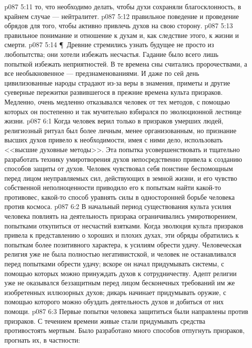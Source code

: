 \vs p087 5:11 \bibnobreakspace {} то, что необходимо делать, чтобы духи сохраняли благосклонность, в крайнем случае --- нейтралитет.
\vs p087 5:12 \bibnobreakspace {} правильное поведение и проведение обрядов для того, чтобы активно привлечь духов на свою сторону.
\vs p087 5:13 \bibnobreakspace {} правильное понимание и отношение к духам и, как следствие этого, к жизни и смерти.
\vs p087 5:14 \P\ Древние стремились узнать будущее не просто из любопытства; они хотели избежать несчастья. Гадание было всего лишь попыткой избежать неприятностей. В те времена сны считались пророчествами, а все необыкновенное --- предзнаменованиями. И даже по сей день цивилизованные народы страдают из\hyp{}за веры в знамения, приметы и другие суеверные пережитки развившегося в прежние времена культа призраков. Медленно, очень медленно отказывался человек от тех методов, с помощью которых он постепенно и так мучительно взбирался по эволюционной лестнице жизни.
\vs p087 6:1 Когда человек верил только в призраков умерших людей, религиозный ритуал был более личным, менее организованным, но признание высших духов привело к необходимости, имея с ними дело, использовать <<высшие духовные методы>>. Эта попытка усовершенствовать и тщательно разработать технику умиротворения духов непосредственно привела к созданию способов защиты от духов. Человек чувствовал себя поистине беспомощным перед лицом неуправляемых сил, действующих в земной жизни, и его чувство собственной неполноценности приводило его к попыткам найти какой\hyp{}то противовес, какой\hyp{}то способ уравнять силы в односторонней борьбе человека против космоса.
\vs p087 6:2 В начальный период существования культа усилия человека повлиять на деятельность призрака ограничивались умиротворением, попытками откупиться от несчастий взятками. Когда эволюция культа призраков привела к представлению о хороших и плохих духах, эти обряды обратились к попыткам более позитивного характера, к усилиям обрести удачу. Человеческая религия уже не была полностью негативистской, и человек не останавливался перед попытками обрести удачу; вскоре он начал придумывать системы, с помощью которых можно принуждать духов к сотрудничеству. Адепт религии уже не оказывался беззащитным перед лицом бесконечных требований им же изобретенных иллюзорных духов; дикарь начинает придумывать оружие, с помощью которого можно обуздать деятельность духов и добиться от них помощи.
\vs p087 6:3 Первые попытки человека защититься были направлены против призраков. С течением времени живые стали придумывать средства противостоять мертвым. Было разработано много способов отпугнуть призраков, прогнать их, в частности:
